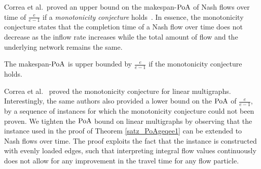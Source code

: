 
Correa et al.\ proved an upper bound on the makespan-$\operatorname*{PoA}$ of Nash flows over time of $\frac{e}{e-1}$ if a \emph{monotonicity conjecture} holds~\cite{DBLP:journals/mor/CorreaCO22}. In essence, the monotonicity conjecture states that the completion time of a Nash flow over time does not decrease as the inflow rate increases while the total amount of flow and the underlying network remains the same.
\begin{proposition}
    The makespan-$\operatorname*{PoA}$ is upper bounded by $\frac{e}{e-1}$ if the monotonicity conjecture holds.
\end{proposition}

\noindent Correa et al.~\cite{DBLP:journals/mor/CorreaCO22} proved the monotonicity conjecture for linear multigraphs. Interestingly, the same authors also provided a lower bound on the $\operatorname*{PoA}$ of $\frac{e}{e-1}$, by a sequence of instances for which the monotonicity conjecture could not been proven. We tighten the $\operatorname*{PoA}$ bound on linear multigraphs by observing that the instance used in the proof of Theorem \ref{satz_PoAgeqee1} can be extended to Nash flows over time. The proof exploits the fact that the instance is constructed with evenly loaded edges, such that interpreting integral flow values continuously does not allow for any improvement in the travel time for any flow particle.



